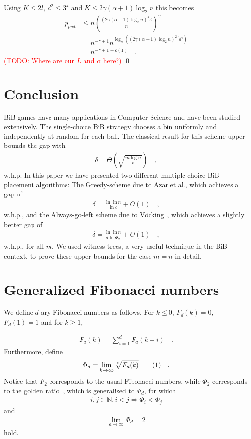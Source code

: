 \documentclass[a4paper,12pt]{article}
\newcommand\todo[1]{\textcolor{red}{(TODO: #1)}}
\newcommand\numberthis{\addtocounter{equation}{1}\tag{\theequation}}
\newcommand\neqn[1]{\numberthis\label{eqn:#1}}
\begin{document}
Using $K \leq 2l$, $d^2 \leq 3^d$ and $K \leq 2\gamma  \left( \alpha +1 \right)  \log_2 n$ this becomes
\begin{align*}
p_{pwt} &\leq n \left(\frac{\left(2\gamma  \left(\alpha +1 \right)  \log_2 n\right)^2 d}{n}\right)^\gamma \\
        &= n^{-\gamma +1}  n ^{\log_n\left( \left(2\gamma \left(\alpha+1\right) \log_2n \right)^{2\gamma}  d^\gamma \right)}\\
        &= n^{-\gamma+1+o\left(1\right)} \quad .
\end{align*}
\todo{Where are our $L$ and $\alpha$ here?}
\qed
 
\section{Conclusion}
\label{sec:conclusion}
BiB games have many applications in Computer Science and have been studied extensively. The single-choice BiB strategy chooses a bin uniformly and independently at random for each ball. The classical result for this scheme upper-bounds the gap with~\cite{RS98}
\begin{align*}
\delta =  \Theta\left(\sqrt{\frac{m  \log n}{n}}\right) \quad ,
\end{align*}
w.h.p.
In this paper we have presented two different multiple-choice BiB placement algorithms: The Greedy-scheme due to Azar et al.\cite{ABKU99}, which achieves a gap of 
\begin{align*}
\delta = \frac{\ln\ln n}{\ln d} + O(1) \quad ,
\end{align*}
w.h.p., and the Always-go-left scheme due to V\"ocking~\cite{VOC03}, which achieves a slightly better gap of
\begin{align*}
\delta = \frac{\ln \ln n}{d \ln \Phi_d} + O(1) \quad ,
\end{align*}
w.h.p., for all $m$. We used witness trees, a very useful technique in the BiB context, to prove these upper-bounds for the case $m=n$ in detail.


\appendix
\section{Generalized Fibonacci numbers}
\label{sec:fibonacci}
We define $d$-ary Fibonacci numbers as follows. For $k \leq0$, $F_d(k) = 0$, $F_d(1) = 1$ and for $k \geq 1$,

\begin{align*}
F_d(k) = \sum_{i=1}^{d}F_d(k-i) \quad .
\end{align*}
Furthermore, define 
\begin{align*}
\Phi_d = \lim_{k \rightarrow \infty} \sqrt[k]{F_d(k)} \neqn{goldenFib} \quad .
\end{align*}
Notice that $F_2$ corresponds to the usual Fibonacci numbers, while $\Phi_2 $ corresponds to the golden ratio~\cite{Knuth73}, which is generalized to $\Phi_d$, for which 
\begin{align*}
i, j \in \mathbb{N}, i < j \Rightarrow \Phi_i < \Phi_j
\end{align*}
and 
\begin{align*}
\lim_{d\rightarrow \infty} \Phi_d = 2
\end{align*}
hold.
\end{document}
